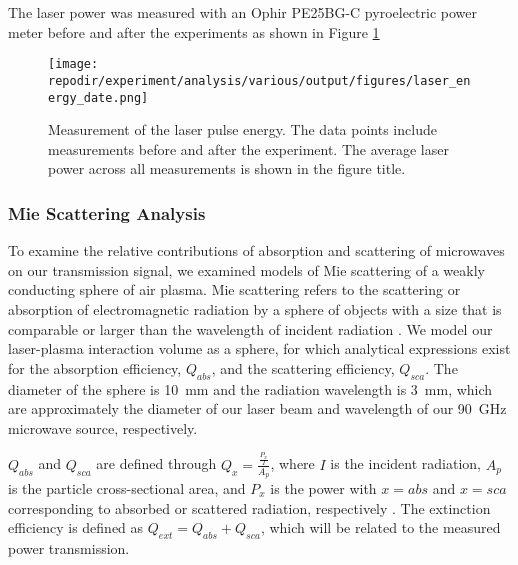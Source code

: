 
The laser power was measured with an Ophir PE25BG-C pyroelectric power meter before and after the experiments as shown in Figure \ref{fig:SI_Laser_Energy} 



\begin{figure}[H]
\centering
\texttt{[image: \\repodir/experiment/analysis/various/output/figures/laser\_energy\_date.png]}
\caption{Measurement of the laser pulse energy. The data points include measurements before and after the experiment. The average laser power across all measurements is shown in the figure title. }
\label{fig:SI_Laser_Energy}
\end{figure}


\subsubsection{Mie Scattering Analysis}

To examine the relative contributions of absorption and scattering of microwaves on our transmission signal, we examined models of Mie scattering of a weakly conducting sphere of air plasma. Mie scattering refers to the scattering or absorption of electromagnetic radiation by a sphere of objects with a size that is comparable or larger than the wavelength of incident radiation \cite{bohrenAbsorptionScatteringLight2007}. We model our laser-plasma interaction volume as a sphere, for which analytical expressions exist for the absorption efficiency, $Q_{abs}$, and the scattering efficiency, $Q_{sca}$. The diameter of the sphere is \SI{10}{\milli\meter} and the radiation wavelength is \SI{3}{\milli\meter}, which are approximately the diameter of our laser beam and wavelength of our \SI{90}{\giga\hertz} microwave source, respectively.  %

$Q_{abs}$ and $Q_{sca}$ are defined through $Q_x = \frac{\frac{P_x}{I}}{A_p}$, where $I$ is the incident radiation, $A_p$ is the particle cross-sectional area, and $P_x$ is the power with $x=abs$ and $x=sca$ corresponding to absorbed or scattered radiation, respectively \cite{bohrenAbsorptionScatteringLight2007}. The extinction efficiency is defined as $Q_{ext} = Q_{abs} + Q_{sca}$, which will be related to the measured power transmission. %


